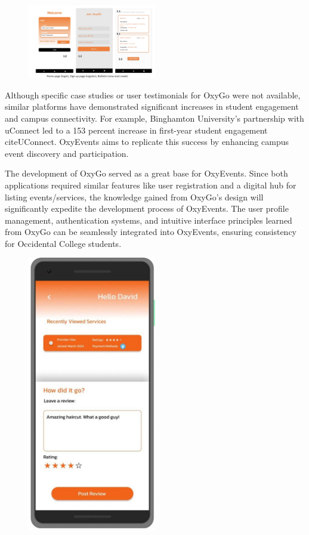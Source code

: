 \documentclass[10pt,twocolumn]{article}
\begin{document}
\begin{figure}[h!]
\includegraphics[width=0.5\textwidth]{images/OxyGo.png}
\centering
\end{figure} 

Although specific case studies or user testimonials for OxyGo were not available, similar platforms have demonstrated significant increases in student engagement and campus connectivity. For example, Binghamton University’s partnership with uConnect led to a 153 percent increase in first-year student engagement cite{UConnect}. OxyEvents aims to replicate this success by enhancing campus event discovery and participation.

The development of OxyGo served as a great base for OxyEvents. Since both applications required similar features like user registration and a digital hub for listing events/services, the knowledge gained from OxyGo's design will significantly expedite the development process of OxyEvents. The user profile management, authentication systems, and intuitive interface principles learned from OxyGo can be seamlessly integrated into OxyEvents, ensuring consistency for Occidental College students.

\begin{figure}[h!]
\includegraphics[width=0.5\textwidth]{images/OxyGo(UserProfile).jpg}
\centering
\end{figure} 
\end{document}
